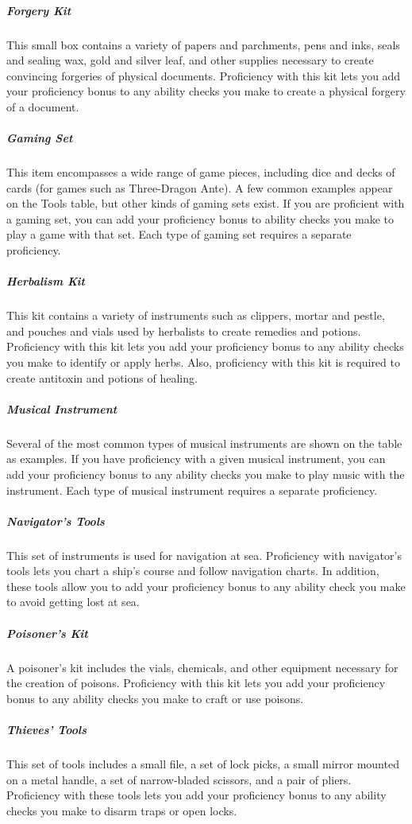 \subparagraph*{Forgery Kit} This small box contains a variety of papers and parchments, pens and inks, seals and sealing wax, gold and silver leaf, and other supplies necessary to create convincing forgeries of physical documents. Proficiency with this kit lets you add your proficiency bonus to any ability checks you make to create a physical forgery of a document.

\subparagraph*{Gaming Set} This item encompasses a wide range of game pieces, including dice and decks of cards (for games such as Three-Dragon Ante). A few common examples appear on the Tools table, but other kinds of gaming sets exist. If you are proficient with a gaming set, you can add your proficiency bonus to ability checks you make to play a game with that set. Each type of gaming set requires a separate proficiency.

\subparagraph*{Herbalism Kit} This kit contains a variety of instruments such as clippers, mortar and pestle, and pouches and vials used by herbalists to create remedies and potions. Proficiency with this kit lets you add your proficiency bonus to any ability checks you make to identify or apply herbs. Also, proficiency with this kit is required to create antitoxin and potions of healing.

\subparagraph*{Musical Instrument} Several of the most common types of musical instruments are shown on the table as examples. If you have proficiency with a given musical instrument, you can add your proficiency bonus to any ability checks you make to play music with the instrument. Each type of musical instrument requires a separate proficiency.

\subparagraph*{Navigator's Tools} This set of instruments is used for navigation at sea. Proficiency with navigator's tools lets you chart a ship's course and follow navigation charts. In addition, these tools allow you to add your proficiency bonus to any ability check you make to avoid getting lost at sea.

\subparagraph*{Poisoner's Kit} A poisoner's kit includes the vials, chemicals, and other equipment necessary for the creation of poisons. Proficiency with this kit lets you add your proficiency bonus to any ability checks you make to craft or use poisons.

\subparagraph*{Thieves' Tools} This set of tools includes a small file, a set of lock picks, a small mirror mounted on a metal handle, a set of narrow-bladed scissors, and a pair of pliers. Proficiency with these tools lets you add your proficiency bonus to any ability checks you make to disarm traps or open locks.

